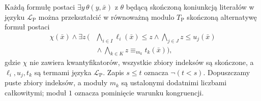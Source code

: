 \begin{lemat}
\label{lem:mod-qe-presburger-normal}
Każdą formułę postaci $\exists y\,\theta(y,\bar x)$
z $\theta$ będącą skończoną koniunkcją literałów
w języku $\mathcal L_{\mathrm P}$ można przekształcić
w równoważną modulo $T_{\mathrm P}$ skończoną alternatywę
formuł postaci
\[
\begin{aligned}
\chi(\bar x)\land \exists z\,\bigg(&
\bigwedge_{i\in I}\ell_i(\bar x)\leq z
\land \bigwedge_{j\in J}z\leq u_j(\bar x)\\
&{}\land\bigwedge_{k\in K}
 z\equiv_{m_k}t_k(\bar x)\bigg),
\end{aligned}
\]
gdzie $\chi$ nie zawiera kwantyfikatorów, wszystkie
zbiory indeksów są skończone, a $\ell_i,u_j,t_k$
są termami języka $\mathcal L_{\mathrm P}$.
Zapis $s\leq t$ oznacza $\neg(t<s)$.
Dopuszczamy puste zbiory indeksów, a moduły $m_k$
są ustalonymi dodatnimi liczbami całkowitymi;
moduł $1$ oznacza pominięcie warunku kongruencji.
\end{lemat}
